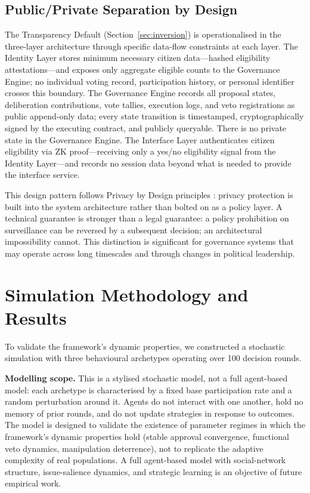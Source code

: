 \documentclass[12pt,a4paper,oneside]{report}
\begin{document}
\section{Public/Private Separation by Design}
\label{sec:pubpriv}

The Transparency Default (Section~\ref{sec:inversion}) is operationalised in the three-layer architecture through specific data-flow constraints at each layer. The Identity Layer stores minimum necessary citizen data---hashed eligibility attestations---and exposes only aggregate eligible counts to the Governance Engine; no individual voting record, participation history, or personal identifier crosses this boundary. The Governance Engine records all proposal states, deliberation contributions, vote tallies, execution logs, and veto registrations as public append-only data; every state transition is timestamped, cryptographically signed by the executing contract, and publicly queryable. There is no private state in the Governance Engine. The Interface Layer authenticates citizen eligibility via ZK proof---receiving only a yes/no eligibility signal from the Identity Layer---and records no session data beyond what is needed to provide the interface service.

This design pattern follows Privacy by Design principles \citep{boneh2020graduate}: privacy protection is built into the system architecture rather than bolted on as a policy layer. A technical guarantee is stronger than a legal guarantee: a policy prohibition on surveillance can be reversed by a subsequent decision; an architectural impossibility cannot. This distinction is significant for governance systems that may operate across long timescales and through changes in political leadership.

\chapter{Simulation Methodology and Results}
\label{sec:simulation}

To validate the framework's dynamic properties, we constructed a stochastic simulation with three behavioural archetypes operating over 100 decision rounds.

\begin{mdframed}
\textbf{Modelling scope.} This is a stylised stochastic model, not a full agent-based model: each archetype is characterised by a fixed base participation rate and a random perturbation around it. Agents do not interact with one another, hold no memory of prior rounds, and do not update strategies in response to outcomes. The model is designed to validate the existence of parameter regimes in which the framework's dynamic properties hold (stable approval convergence, functional veto dynamics, manipulation deterrence), not to replicate the adaptive complexity of real populations. A full agent-based model with social-network structure, issue-salience dynamics, and strategic learning is an objective of future empirical work.
\end{mdframed}
\end{document}
